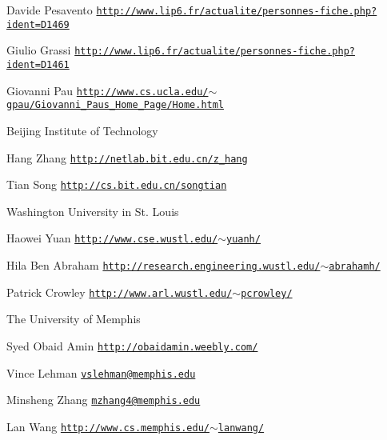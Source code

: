 \begin{DoxyItemize}
\begin{DoxyItemize}
\item Davide Pesavento \href{http://www.lip6.fr/actualite/personnes-fiche.php?ident=D1469}{\tt http\+://www.\+lip6.\+fr/actualite/personnes-\/fiche.\+php?ident=\+D1469}
\item Giulio Grassi \href{http://www.lip6.fr/actualite/personnes-fiche.php?ident=D1461}{\tt http\+://www.\+lip6.\+fr/actualite/personnes-\/fiche.\+php?ident=\+D1461}
\item Giovanni Pau \href{http://www.cs.ucla.edu/~gpau/Giovanni_Paus_Home_Page/Home.html}{\tt http\+://www.\+cs.\+ucla.\+edu/$\sim$gpau/\+Giovanni\+\_\+\+Paus\+\_\+\+Home\+\_\+\+Page/\+Home.\+html}
\end{DoxyItemize}
\item Beijing Institute of Technology
\begin{DoxyItemize}
\item Hang Zhang \href{http://netlab.bit.edu.cn/z_hang}{\tt http\+://netlab.\+bit.\+edu.\+cn/z\+\_\+hang}
\item Tian Song \href{http://cs.bit.edu.cn/songtian}{\tt http\+://cs.\+bit.\+edu.\+cn/songtian}
\end{DoxyItemize}
\item Washington University in St. Louis
\begin{DoxyItemize}
\item Haowei Yuan \href{http://www.cse.wustl.edu/~yuanh/}{\tt http\+://www.\+cse.\+wustl.\+edu/$\sim$yuanh/}
\item Hila Ben Abraham \href{http://research.engineering.wustl.edu/~abrahamh/}{\tt http\+://research.\+engineering.\+wustl.\+edu/$\sim$abrahamh/}
\item Patrick Crowley \href{http://www.arl.wustl.edu/~pcrowley/}{\tt http\+://www.\+arl.\+wustl.\+edu/$\sim$pcrowley/}
\end{DoxyItemize}
\item The University of Memphis
\begin{DoxyItemize}
\item Syed Obaid Amin \href{http://obaidamin.weebly.com/}{\tt http\+://obaidamin.\+weebly.\+com/}
\item Vince Lehman \href{mailto:vslehman@memphis.edu}{\tt vslehman@memphis.\+edu}
\item Minsheng Zhang \href{mailto:mzhang4@memphis.edu}{\tt mzhang4@memphis.\+edu}
\item Lan Wang \href{http://www.cs.memphis.edu/~lanwang/}{\tt http\+://www.\+cs.\+memphis.\+edu/$\sim$lanwang/}
\end{DoxyItemize}
\end{DoxyItemize}

